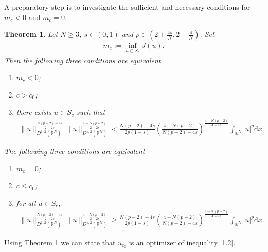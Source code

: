 \documentclass[12pt,a4paper,reqno]{amsart}
\numberwithin{equation}{section}
\newtheorem{theorem}{Theorem}[section]
\begin{document}
A preparatory step is to investigate the sufficient and necessary conditions for $m_{c}<0$ and $m_{c}=0$.
\begin{theorem}\label{Theorem1.4}
Let $N\geqslant3$, $s\in(0,1)$ and  $p\in(2+\frac{4s}{N},2+\frac{4}{N})$. Set
\begin{equation*}
\begin{aligned}
m_{c}:=\inf_{u\in S_{c}} J(u).
\end{aligned}
\end{equation*}
Then the following three conditions are equivalent
\begin{enumerate}
\item [$(a)$] $m_{c}<0$;

\item [$(b)$] $c>c_{0}$;

\item [$(c)$] there exists $u\in S_{c}$ such that
\begin{equation*}
\begin{aligned}
\|u\|_{D^{1,2}(\mathbb{R}^{N})}^{\frac{N(p-2)-4s}{2-2s}}
\|u\|_{D^{s,2}(\mathbb{R}^{N})}^{\frac{4-N(p-2)}{2-2s}}
<
\frac{N(p-2)-4s}{2p(1-s)}
\left(
\frac{4-N(p-2)}{N(p-2)-4s}
\right)^{\frac{4-N(p-2)}{4-4s}}
\int_{\mathbb{R}^{N}}
|u|^{p}
\mathrm{d}x.
\end{aligned}
\end{equation*}
\end{enumerate}

\noindent The following three conditions are equivalent
\begin{enumerate}
\item [$(a')$]
$m_{c}=0$;

\item [$(b')$]
$c\leqslant c_{0}$;

\item [$(c')$]
for all $u\in S_{c}$,
\begin{equation*}
\begin{aligned}
\|u\|_{D^{1,2}(\mathbb{R}^{N})}^{\frac{N(p-2)-4s}{2-2s}}
\|u\|_{D^{s,2}(\mathbb{R}^{N})}^{\frac{4-N(p-2)}{2-2s}}
\geqslant
\frac{N(p-2)-4s}{2p(1-s)}
\left(
\frac{4-N(p-2)}{N(p-2)-4s}
\right)^{\frac{4-N(p-2)}{4-4s}}
\int_{\mathbb{R}^{N}}
|u|^{p}
\mathrm{d}x.
\end{aligned}
\end{equation*}
\end{enumerate}
\end{theorem}
Using Theorem \ref{Theorem1.4} we can state that $u_{c_{0}}$ is an optimizer of inequality \eqref{1.2}.
\end{document}
